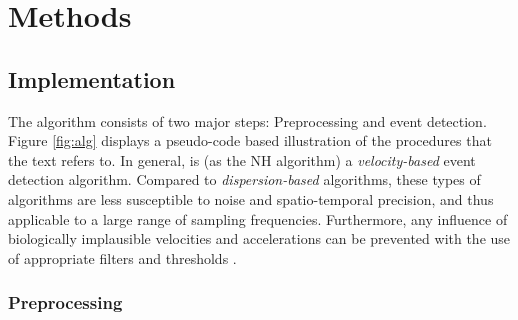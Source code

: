 

\section*{Methods}\label{methods}



\subsection*{\remodnav Implementation}\label{impl}


The algorithm consists of two major steps: Preprocessing and event detection.
Figure \ref{fig:alg} displays a pseudo-code based illustration of the
procedures that the text refers to. In general, \remodnav is (as the NH
algorithm) a \textit{velocity-based} event detection algorithm. Compared to
\textit{dispersion-based} algorithms, these types of algorithms are less
susceptible to noise and spatio-temporal precision, and thus applicable to a
large range of sampling frequencies. Furthermore, any influence of biologically
implausible velocities and accelerations can be prevented with the use of
appropriate filters and thresholds \citep{holmqvist2011eye}.

\subsubsection*{Preprocessing}

